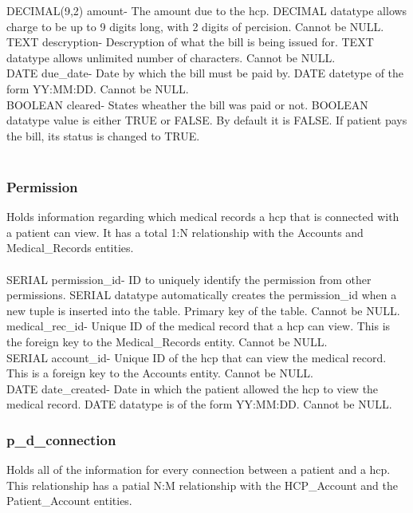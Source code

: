 \documentclass[12pt]{report}
\begin{document}
DECIMAL(9,2) amount- The amount due to the hcp.  DECIMAL datatype allows charge to be up to 9 digits long, with 2 digits of percision.  Cannot be NULL.\\
 
TEXT descryption- Descryption of what the bill is being issued for.  TEXT datatype allows unlimited number of characters. Cannot be NULL.\\

DATE due\_date- Date by which the bill must be paid by.  DATE datetype of the form YY:MM:DD.  Cannot be NULL.\\

BOOLEAN cleared- States wheather the bill was paid or not.  BOOLEAN datatype value is either TRUE or FALSE.  By default it is FALSE.  If patient pays the bill, its status is changed to TRUE.\\ \\

\subsubsection{Permission}
Holds information regarding which medical records a hcp that is connected with a patient can view.  It has a total 1:N relationship with the Accounts and Medical\_Records entities.\\ \\

SERIAL permission\_id-  ID to uniquely identify the permission from other permissions. SERIAL datatype automatically creates the permission\_id when a new tuple is inserted into the table.  Primary key of the table.  Cannot be NULL.\\

medical\_rec\_id- Unique ID of the medical record that a hcp can view.  This is the foreign key to the Medical\_Records entity.  Cannot be NULL.\\   

SERIAL account\_id- Unique ID of the hcp that can view the medical record.  This is a foreign key to the Accounts entity.  Cannot be NULL.\\

DATE date\_created-  Date in which the patient allowed the hcp to view the medical record.  DATE datatype is of the form YY:MM:DD.  Cannot be NULL.\\

\subsubsection{p\_d\_connection}
Holds all of the information for every connection between a patient and a hcp.  This relationship has a patial N:M relationship with the HCP\_Account and the Patient\_Account entities.\\ \\
\end{document}
